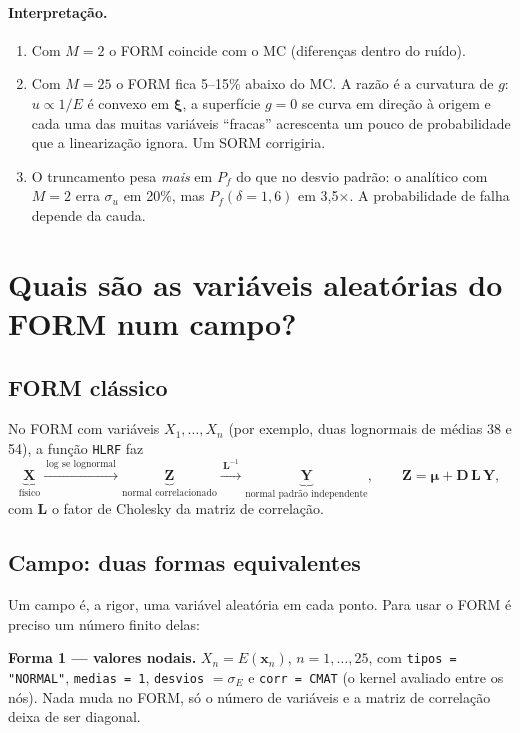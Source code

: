 \documentclass[11pt,a4paper]{article}
\newcommand{\bx}{\bm{x}}
\newcommand{\bxi}{\bm{\xi}}
\begin{document}
\paragraph{Interpretação.}
\begin{enumerate}
  \item Com $M=2$ o FORM coincide com o MC (diferenças dentro do ruído).
  \item Com $M=25$ o FORM fica 5--15\% abaixo do MC. A razão é a curvatura de $g$: $u\propto1/E$ é convexo em $\bxi$, a superfície $g=0$ se curva em direção à origem e cada uma das muitas variáveis ``fracas'' acrescenta um pouco de probabilidade que a linearização ignora. Um SORM corrigiria.
  \item O truncamento pesa \emph{mais} em $P_f$ do que no desvio padrão: o analítico com $M=2$ erra $\sigma_u$ em 20\%, mas $P_f(\delta=1{,}6)$ em 3,5$\times$. A probabilidade de falha depende da cauda.
\end{enumerate}

\section{Quais são as variáveis aleatórias do FORM num campo?}\label{sec:variaveis}
\subsection{FORM clássico}
No FORM com variáveis $X_1,\dots,X_n$ (por exemplo, duas lognormais de médias 38 e 54), a função \texttt{HLRF} faz
\[
\underbrace{\bm{X}}_{\text{físico}}
\xrightarrow{\ \log\text{ se lognormal}\ }
\underbrace{\bm{Z}}_{\text{normal correlacionado}}
\xrightarrow{\ \bm{L}^{-1}\ }
\underbrace{\bm{Y}}_{\text{normal padrão independente}},
\qquad \bm{Z}=\bm{\mu}+\bm{D}\,\bm{L}\,\bm{Y},
\]
com $\bm{L}$ o fator de Cholesky da matriz de correlação.

\subsection{Campo: duas formas equivalentes}
Um campo é, a rigor, uma variável aleatória em cada ponto. Para usar o FORM é preciso um número finito delas:

\textbf{Forma 1 --- valores nodais.} $X_n=E(\bx_n)$, $n=1,\dots,25$, com \texttt{tipos = "NORMAL"}, \texttt{medias = 1}, \texttt{desvios} $=\sigma_E$ e \texttt{corr = CMAT} (o kernel avaliado entre os nós). Nada muda no FORM, só o número de variáveis e a matriz de correlação deixa de ser diagonal.
\end{document}

